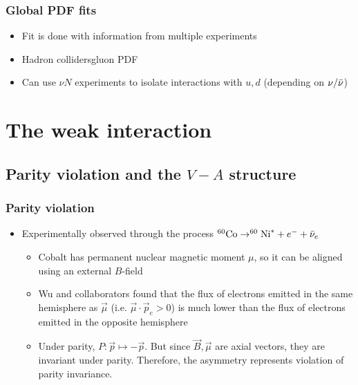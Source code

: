 \subsubsection{Global PDF fits}
\begin{itemize}
  \item Fit is done with information from multiple experiments
  \item Hadron colliders\thus gluon PDF
  \item Can use $\nu N$ experiments to isolate interactions with $u,d$ (depending on $\nu/{\bar{\nu}}$)
\end{itemize}

\section{The weak interaction}
\subsection{Parity violation and the $V-A$ structure}
\subsubsection{Parity violation}
\begin{itemize}
  \item Experimentally observed through the process $^{60}\text{Co}\rightarrow^{60}\text{Ni}^* + e^{-} + {\bar{\nu}}_e$
  \begin{itemize}
    \item Cobalt has permanent nuclear magnetic moment $\mu$, so it can be aligned using an external $B$-field
    \item Wu and collaborators found that the flux of electrons emitted in the same hemisphere as $\vec\mu$ (i.e. $\vec\mu\cdot \vec p_e>0$) is much lower than the flux of electrons emitted in the opposite hemisphere
    \item Under parity, $P:\vec p \mapsto - \vec p$. But since $\vec B,\vec \mu$ are axial vectors, they are invariant under parity. Therefore, the asymmetry represents violation of parity invariance.
  \end{itemize}
\end{itemize}
